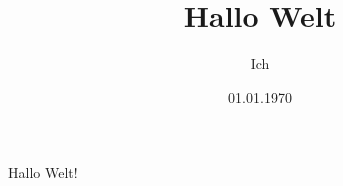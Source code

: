 \documentclass{article}
\author{Ich}
\title{Hallo Welt}
\date{01.01.1970}
\begin{document}
	\maketitle
	Hallo Welt!
\end{document}
